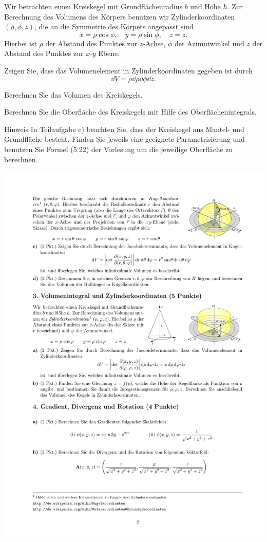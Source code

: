 \documentclass{scrartcl}
\begin{document}
Wir betrachten einen Kreiskegel mit Grundflächenradius $b$ und Höhe $h$.
Zur Berechnung des Volumens des Körpers benutzen wir Zylinderkoordinaten $(\rho,\phi,z)$, die an die Symmetrie des Körpers angepasst sind
\[
  x = \rho \cos \phi, \quad y = \rho \sin \phi, \quad z = z.
\]
Hierbei ist $\rho$ der Abstand des Punktes zur $z$-Achse, $\phi$ der Azimutwinkel und $z$ der Abstand des Punktes zur $x$-$y$ Ebene.
\begin{subex}
  \item{} Zeigen Sie, dass das Volumenelement in Zylinderkoordinaten gegeben ist durch
  \[
    \dd V = \rho \dd \rho \dd \phi \dd z.
  \]

  \item{} Berechnen Sie das Volumen des Kreiskegels.

  \item{} Berechnen Sie die Oberfläche des Kreiskegels mit Hilfe des Oberflächenintegrals.
\end{subex}
\begin{remark}{Hinweis}
  In Teilaufgabe c) beachten Sie, dass der Kreiskegel aus Mantel- und Grundfläche besteht.
  Finden Sie jeweils eine geeignete Parametrisierung und benutzen Sie Formel (5.22) der Vorlesung um die jeweilige Oberfläche zu berechnen.
\end{remark}

\begin{center}
  \includegraphics{img/cylinder.pdf}
\end{center}
\end{document}

